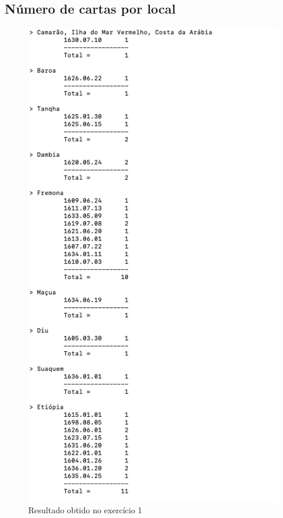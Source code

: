 \documentclass[11pt,a4paper]{report}
\begin{document}
\subsection{Número de cartas por local}
\begin{figure}[h]
\includegraphics[scale=0.50]{ex1}
\caption{Resultado obtido no exercício 1}
\end{figure}
\end{document}
